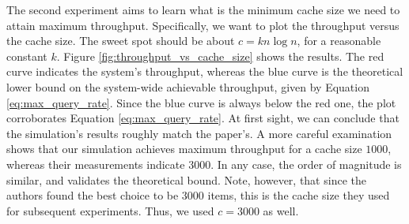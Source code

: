 \documentclass[10pt,letterpaper]{article}
\begin{document}
The second experiment aims to learn what is the minimum cache size we need to attain maximum throughput. Specifically, we want to plot the throughput versus the cache size. The sweet spot should be about $c = k n \log n$, for a reasonable constant $k$. Figure \ref{fig:throughput_vs_cache_size} shows the results. The red curve indicates the system's throughput, whereas the blue curve is the theoretical lower bound on the system-wide achievable throughput, given by Equation \ref{eq:max_query_rate}. Since the blue curve is always below the red one, the plot corroborates Equation \ref{eq:max_query_rate}. At first sight, we can conclude that the simulation's results roughly match the paper's. A more careful examination shows that our simulation achieves maximum throughput for a cache size $1000$, whereas their measurements indicate $3000$. In any case, the order of magnitude is similar, and validates the theoretical bound. Note, however, that since the authors found the best choice to be $3000$ items, this is the cache size they used for subsequent experiments. Thus, we used $c = 3000$ as well.
\end{document}
